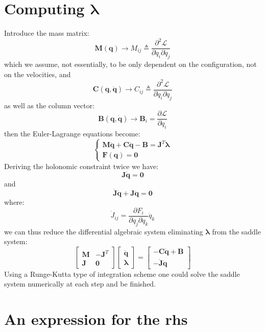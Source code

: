 \documentclass{article}
\begin{document}
\section{Computing $\bm \lambda$}
Introduce the mass matrix:
$$
\bm M(\bm q) \rightarrow M_{ij} \triangleq \frac{\partial^2 \mathcal L}{\partial \dot q_i \partial \dot q_j}
$$
which we assume, not essentially, to be only dependent on the configuration, not on the velocities, and 
$$
\bm C(\bm q, \dot{\bm q}) \rightarrow C_{ij} \triangleq \frac{\partial^2 \mathcal L}{\partial \dot q_i \partial  q_j}
$$
as well as the column vector:
$$
\bm B(\bm q, \dot{\bm q}) \rightarrow \bm B_{i} = \frac{\partial\mathcal L}{\partial q_i}
$$
then the Euler-Lagrange equations become:
\begin{equation*}
\boxed{
\left\{
\begin{array}{l}
\displaystyle
\bm M \ddot{\bm q} + \bm C \dot {\bm q} - \bm B = \bm J^T\bm\lambda
\\[1.2em]
\bm F(\bm q)=\bm 0
\end{array}
\right.
}
\end{equation*}
Deriving the holonomic constraint twice we have:
$$
\bm J \dot{\bm q} = \bm 0
$$
and
$$
\dot{\bm J}\dot{\bm q} + \bm J \ddot{\bm q} = \bm 0
$$
where:
$$
\dot J_{ij} = \frac{\partial F_i}{\partial q_j\partial q_k} \dot q_k
$$
we can thus reduce the differential algebraic system eliminating $\bm \lambda$ from the saddle system:
$$\left[
\begin{array}{ll}
\bm M & -\bm J^T \\
\bm J & \bm 0
\end{array}
\right]
\left[
\begin{array}{l}
\ddot{\bm q} \\
\bm \lambda
\end{array}
\right] = 
\left[
\begin{array}{c}
- \bm C \dot{\bm q} + \bm B \\
- \dot{\bm J}\dot{\bm q}
\end{array}
\right]
$$
Using a Runge-Kutta type of integration scheme one could solve the saddle system numerically at each step and be finished.
\section{An expression for the rhs}
\end{document}
